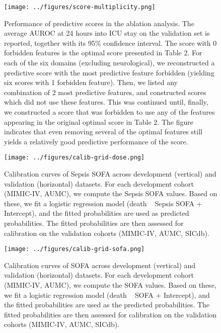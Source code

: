 \documentclass[
]{article}
\begin{document}
\begin{figure}
    \centering
    \texttt{[image: ../figures/score-multiplicity.png]}
    \caption{Performance of predictive scores in the ablation analysis.
    The average AUROC at 24 hours into ICU stay on the validation set is reported,
    together with its 95\% confidence interval.
    The score with 0 forbidden features is the optimal score presented in Table 2.
    For each of the six domains (excluding neurological),
    we reconstructed a predictive score with the most predictive feature forbidden
    (yielding six scores with 1 forbidden feature).
    Then, we listed any combination of 2 most predictive features, and constructed
    scores which did not use these features. This was continued until, finally,
    we constructed a score that was forbidden to use any of the features appearing
    in the original optimal score in Table 2. The figure indicates that even
    removing several of the optimal features still yields a relatively good predictive
    performance of the score.}
\end{figure}

\begin{figure}
    \centering
    \texttt{[image: ../figures/calib-grid-dose.png]}
    \caption{Calibration curves of Sepsis SOFA across development
    (vertical) and validation (horizontal) datasets. For each development cohort
    (MIMIC-IV, AUMC), we compute the Sepsis SOFA values. Based on
    these, we fit a logistic regression model (death ~ Sepsis SOFA +
    Intercept), and the fitted probabilities are used as predicted probabilities.
    The fitted probabilities are then assessed for calibration on the validation
    cohorts (MIMIC-IV, AUMC, SICdb).}
\end{figure}

\begin{figure}
    \centering
    \texttt{[image: ../figures/calib-grid-sofa.png]}
    \caption{Calibration curves of SOFA across development (vertical) and
    validation (horizontal) datasets. For each development cohort (MIMIC-IV, AUMC),
    we compute the SOFA values. Based on these, we fit a logistic regression
    model (death ~ SOFA + Intercept), and the fitted probabilities are used as
    the predicted probabilities. The fitted probabilities are then assessed for
    calibration on the validation cohorts (MIMIC-IV, AUMC, SICdb).}
\end{figure}
\end{document}
